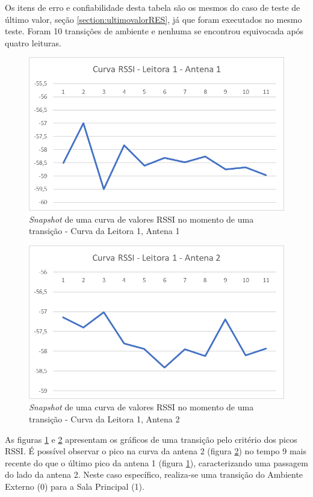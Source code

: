 Os itens de erro e confiabilidade desta tabela são os mesmos do caso de teste de último valor, seção \ref{section:ultimovalorRES}, já que foram executados no mesmo teste. Foram 10 transições de ambiente e nenhuma se encontrou equivocada após quatro leituras.

\begin{figure}[H]
    \centering
    \includegraphics[width=0.8\linewidth]{figs/Resultados/image001.png}
    \caption{\textit{Snapshot} de uma curva de valores RSSI no momento de uma transição - Curva da Leitora 1, Antena 1}
    \label{fig:tranRSSI11}
\end{figure}

\begin{figure}[H]
    \centering
    \includegraphics[width=0.8\linewidth]{figs/Resultados/image002.png}
    \caption{\textit{Snapshot} de uma curva de valores RSSI no momento de uma transição - Curva da Leitora 1, Antena 2}
    \label{fig:tranRSSI12}
\end{figure}

As figuras \ref{fig:tranRSSI11} e \ref{fig:tranRSSI12} apresentam os gráficos de uma transição pelo critério dos picos RSSI. É possível observar o pico na curva da antena 2 (figura \ref{fig:tranRSSI12}) no tempo 9 mais recente do que o último pico da antena 1 (figura \ref{fig:tranRSSI11}), caracterizando uma passagem do lado da antena 2. Neste caso específico, realiza-se uma transição do Ambiente Externo (0) para a Sala Principal (1).



